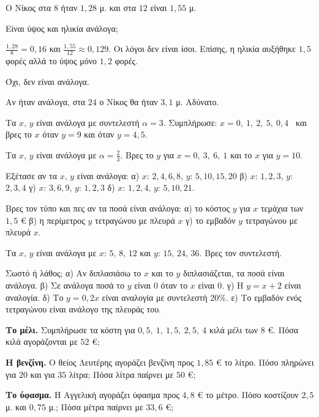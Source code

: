 \tixero Ο Νίκος στα $8$ ήταν $1{,}28$ μ. και στα $12$ είναι $1{,}55$ μ.\par
\tithelo Είναι ύψος και ηλικία ανάλογα;\par
\possindeo $\frac{1{,}28}{8}=0{,}16$ και $\frac{1{,}55}{12}\approx0{,}129$. Οι λόγοι δεν είναι ίσοι. Επίσης, η ηλικία αυξήθηκε $1{,}5$ φορές αλλά το ύψος μόνο $1{,}2$ φορές.\par
\apantisi Όχι, δεν είναι ανάλογα.\par
\elegxos Αν ήταν ανάλογα, στα $24$ ο Νίκος θα ήταν $3{,}1$ μ. Αδύνατο.



\ex Τα $x,\,y$ είναι ανάλογα με συντελεστή $\alpha=3$. Συμπλήρωσε: $x=0,\ 1,\ 2,\ 5,\ 0{,}4$ \ και βρες το $x$ όταν $y=9$ και όταν $y=4{,}5$.

\ex Τα $x,\,y$ είναι ανάλογα με $\alpha=\frac{2}{3}$. Βρες το $y$ για $x=0,\ 3,\ 6,\ 1$ και το $x$ για $y=10$.

\ex Εξέτασε αν τα $x,\,y$ είναι ανάλογα: α) $x$: $2,4,6,8$, $y$: $5,10,15,20$ \quad β) $x$: $1,2,3$, $y$: $2,3,4$ \quad γ) $x$: $3,6,9$, $y$: $1,2,3$ \quad δ) $x$: $1,2,4$, $y$: $5,10,21$.

\ex Βρες τον τύπο και πες αν τα ποσά είναι ανάλογα: α) το κόστος $y$ για $x$ τεμάχια των $1{,}5$ € \quad β) η περίμετρος $y$ τετραγώνου με πλευρά $x$ \quad γ) το εμβαδόν $y$ τετραγώνου με πλευρά $x$.

\ex Τα $x,\,y$ είναι ανάλογα με $x$: $5,\,8,\,12$ και $y$: $15,\,24,\,36$. Βρες τον συντελεστή.

\ex Σωστό ή λάθος; α) Αν διπλασιάσω το $x$ και το $y$ διπλασιάζεται, τα ποσά είναι ανάλογα. \quad β) Σε ανάλογα ποσά το $y$ είναι $0$ όταν το $x$ είναι $0$. \quad γ) Η $y=x+2$ είναι αναλογία. \quad δ) Το $y=0{,}2x$ είναι αναλογία με συντελεστή $20\%$. \quad ε) Το εμβαδόν ενός τετραγώνου είναι ανάλογο της πλευράς του.


\ex \textbf{Το μέλι.} Συμπλήρωσε τα κόστη για $0{,}5,\ 1,\ 1{,}5,\ 2{,}5,\ 4$ κιλά μέλι των $8$ €. Πόσα κιλά αγοράζονται με $52$ €;

\ex \textbf{Η βενζίνη.} Ο θείος Λευτέρης αγοράζει βενζίνη προς $1{,}85$ € το λίτρο. Πόσο πληρώνει για $20$ και για $35$ λίτρα; Πόσα λίτρα παίρνει με $50$ €;

\ex \textbf{Το ύφασμα.} Η Αγγελική αγοράζει ύφασμα προς $4{,}8$ € το μέτρο. Πόσο κοστίζουν $2{,}5$ μ. και $0{,}75$ μ.; Πόσα μέτρα παίρνει με $33{,}6$ €;


